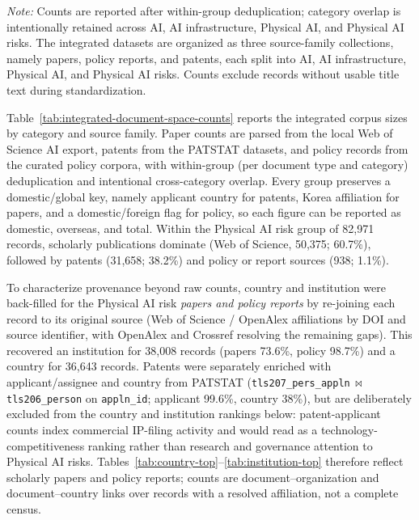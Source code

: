 \documentclass[11pt]{article}
\begin{document}
\begin{table}[htbp]
\centering
\caption{Integrated corpus counts by source family and category}
\label{tab:integrated-document-space-counts}

\par\smallskip\begin{minipage}{0.92\linewidth}
\footnotesize\textit{Note:} Counts are reported after within-group deduplication; category overlap is intentionally retained across AI, AI infrastructure, Physical AI, and Physical AI risks. The integrated datasets are organized as three source-family collections, namely papers, policy reports, and patents, each split into AI, AI infrastructure, Physical AI, and Physical AI risks. Counts exclude records without usable title text during standardization.
\end{minipage}
\end{table}

Table~\ref{tab:integrated-document-space-counts} reports the integrated corpus sizes by category and source family. Paper counts are parsed from the local Web of Science AI export, patents from the PATSTAT datasets, and policy records from the curated policy corpora, with within-group (per document type and category) deduplication and intentional cross-category overlap. Every group preserves a domestic/global key, namely applicant country for patents, Korea affiliation for papers, and a domestic/foreign flag for policy, so each figure can be reported as domestic, overseas, and total. Within the Physical AI risk group of 82,971 records, scholarly publications dominate (Web of Science, 50,375; 60.7\%), followed by patents (31,658; 38.2\%) and policy or report sources (938; 1.1\%).

To characterize provenance beyond raw counts, country and institution were back-filled for the Physical AI risk \emph{papers and policy reports} by re-joining each record to its original source (Web of Science / OpenAlex affiliations by DOI and source identifier, with OpenAlex and Crossref resolving the remaining gaps). This recovered an institution for 38,008 records (papers 73.6\%, policy 98.7\%) and a country for 36,643 records. Patents were separately enriched with applicant/assignee and country from PATSTAT (\texttt{tls207\_pers\_appln}\,$\bowtie$\,\texttt{tls206\_person} on \texttt{appln\_id}; applicant 99.6\%, country 38\%), but are deliberately excluded from the country and institution rankings below: patent-applicant counts index commercial IP-filing activity and would read as a technology-competitiveness ranking rather than research and governance attention to Physical AI risks. Tables~\ref{tab:country-top}--\ref{tab:institution-top} therefore reflect scholarly papers and policy reports; counts are document--organization and document--country links over records with a resolved affiliation, not a complete census.
\end{document}
